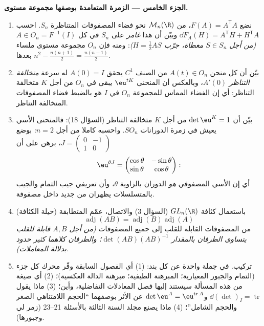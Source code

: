 \begin{problem}
\medskip
\noindent\textbf{الجزء الخامس --- الزمرة المتعامدة بوصفها مجموعة
مستوى.}
\begin{enumerate}[resume]
  \item نضع $F(A) = A^{\mathsf T}A$، من $\mathcal M_n(\R)$ نحو فضاء المصفوفات المتناظرة $S_n$.
        احسب $\dd F_A(H) =
        A^{\mathsf T}H + H^{\mathsf T}A$ وبيّن أن هذا  \emph{غامر} على $S_n$ في كل
        $A \in O_n = F^{-1}(I)$ \emph{(من أجل $S \in S_n$ معطاة، جرّب $H = \frac12 AS$)}: ومنه فإن
        $O_n$ مجموعة مستوى ملساء بعدها $n^2 - \frac{n(n+1)}2 = \frac{n(n-1)}2$.
  \item بيّن أن كل منحن $A(t) \in O_n$ من الصنف $C^1$ يحقق $A(0) =
        I$ له سرعة
        \emph{متخالفة التناظر} $A'(0)$، وبالعكس أن المنحنى $\eu^{tK}$ يبقى
        في $O_n$ من أجل $K$ متخالفة التناظر: أي إن الفضاء المماس
        للمجموعة $O_n$ في $I$ هو بالضبط فضاء المصفوفات المتخالفة
        التناظر.
  \item بيّن أن $\det\eu^{K} = 1$ من أجل $K$ متخالفة التناظر (السؤال 18):
        فالمنحنى الأسي يعيش في زمرة الدورانات $SO_n$. واحسبه كاملا من
        أجل $n = 2$: بوضع $J =
        \begin{pmatrix}0 & -1\\ 1 & 0\end{pmatrix}$، برهن على أن
        \[
        \eu^{\theta J} = \begin{pmatrix} \cos\theta &
        -\sin\theta\\ \sin\theta & \cos\theta\end{pmatrix} :
        \]
        أي إن الأسي المصفوفي \emph{هو} الدوران بالزاوية $\theta$، وأن
        تعريفي جيب التمام والجيب بالمتسلسلات يظهران من جديد داخل
        مصفوفة.
  \item (حيلة الكثافة) باستعمال كثافة $GL_n(\R)$ (السؤال 3) والاتصال،
        عمّم المتطابقة
        \[
        \operatorname{adj}(AB) =
        \operatorname{adj}(B)\operatorname{adj}(A)
        \]
        من المصفوفات القابلة للقلب إلى جميع المصفوفات \emph{(من أجل
        $A, B$ قابلة للقلب يتساوى الطرفان بالمقدار $\det(AB)(AB)^{-1}$؛ والطرفان
        كلاهما كثير حدود بدلالة المعاملات)}.
  \item تركيب. في جملة واحدة عن كل بند: (1) أي الفصول السابقة وفّر
        محرك كل جزء (التمام والجبور المعيارية؛ المبرهنة الطيفية؛
        مبرهنة الدالة العكسية)؛ (2) أي صيغة من هذه المسألة سيستند
        إليها فصل المعادلات التفاضلية، وأين؛ (3) ماذا يقول $\dd(\det)_I = \operatorname{tr}$
        و$\det\eu^A =
        \eu^{\operatorname{tr}A}$ عن الأثر  بوصفهما ``الحجم اللامتناهي الصغر
        والحجم الشامل''؛ (4) ماذا يصنع مجلد السنة الثالثة بالأسئلة
        21--23 (زمر لي وجبورها).
\end{enumerate}
\end{problem}
